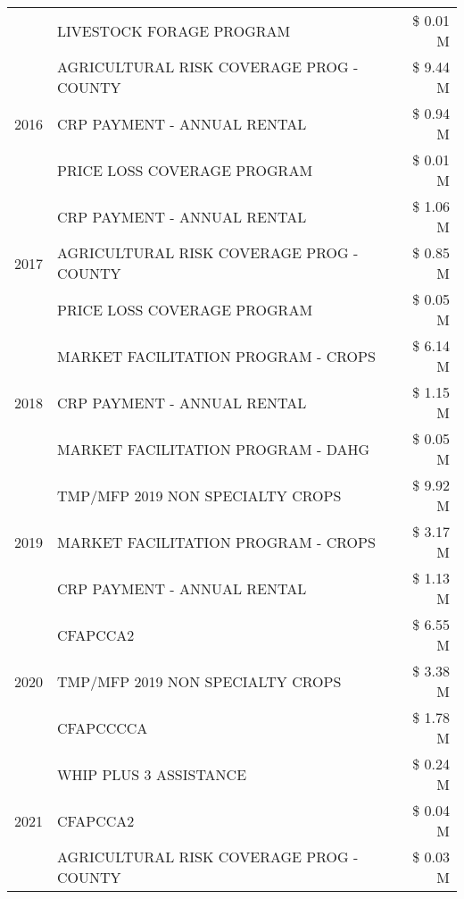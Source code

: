 \begin{tabular}{llr}
 & LIVESTOCK FORAGE PROGRAM & \$ 0.01 M \\
\cline{1-3}
\multirow[t]{3}{*}{2016} & AGRICULTURAL RISK COVERAGE PROG - COUNTY      & \$ 9.44 M \\
 & CRP PAYMENT - ANNUAL RENTAL                   & \$ 0.94 M \\
 & PRICE LOSS COVERAGE PROGRAM                   & \$ 0.01 M \\
\cline{1-3}
\multirow[t]{3}{*}{2017} & CRP PAYMENT - ANNUAL RENTAL & \$ 1.06 M \\
 & AGRICULTURAL RISK COVERAGE PROG - COUNTY & \$ 0.85 M \\
 & PRICE LOSS COVERAGE PROGRAM & \$ 0.05 M \\
\cline{1-3}
\multirow[t]{3}{*}{2018} & MARKET FACILITATION PROGRAM - CROPS & \$ 6.14 M \\
 & CRP PAYMENT - ANNUAL RENTAL & \$ 1.15 M \\
 & MARKET FACILITATION PROGRAM - DAHG & \$ 0.05 M \\
\cline{1-3}
\multirow[t]{3}{*}{2019} & TMP/MFP 2019 NON SPECIALTY CROPS & \$ 9.92 M \\
 & MARKET FACILITATION PROGRAM - CROPS & \$ 3.17 M \\
 & CRP PAYMENT - ANNUAL RENTAL & \$ 1.13 M \\
\cline{1-3}
\multirow[t]{3}{*}{2020} & CFAPCCA2 & \$ 6.55 M \\
 & TMP/MFP 2019 NON SPECIALTY CROPS & \$ 3.38 M \\
 & CFAPCCCCA & \$ 1.78 M \\
\cline{1-3}
\multirow[t]{3}{*}{2021} & WHIP PLUS 3 ASSISTANCE & \$ 0.24 M \\
 & CFAPCCA2 & \$ 0.04 M \\
 & AGRICULTURAL RISK COVERAGE PROG - COUNTY & \$ 0.03 M \\
\cline{1-3}
\bottomrule
\end{tabular}
